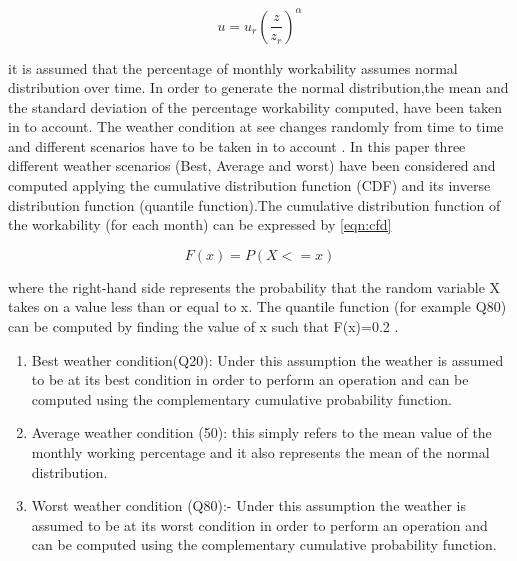 \begin{equation}
\label{eqn:windprofile}
u = u_{r} \left( \frac{z}{z_r} \right)^{\alpha}
\end{equation}

it is assumed that the percentage of monthly workability assumes normal distribution over time. In order to  generate the normal distribution,the mean and the standard deviation of the percentage workability computed, have been taken in to account. The weather condition at see changes randomly from time to time and different scenarios have to be taken in to account . In this paper three different weather scenarios (Best, Average and worst) have been considered and computed applying the cumulative distribution function (CDF) and its inverse distribution function (quantile function).The cumulative distribution function of the workability (for each month) can be expressed by \ref{eqn:cfd}

\begin{equation}
\label{eqn:cfd}
F\left(x \right) =P\left(X<=x\right)

\end{equation}


 where the right-hand side represents the probability that the random variable X takes on a value less than or equal to x. The quantile function (for example Q80) can be computed by finding the value of x such that F(x)=0.2 .  

\begin{enumerate}[label=\roman*]
\item
Best weather condition(Q20): Under this assumption the weather is assumed to be at its best condition in order to perform an operation and can be computed using the complementary cumulative probability function. 
\item
Average weather condition (50): this simply refers to the mean value of the monthly working percentage and it also represents  the mean of the normal distribution.
\item Worst weather condition (Q80):- Under this assumption the weather is assumed to be at its worst condition in order to perform an operation and can be computed using the complementary cumulative probability function. 
\end{enumerate}

